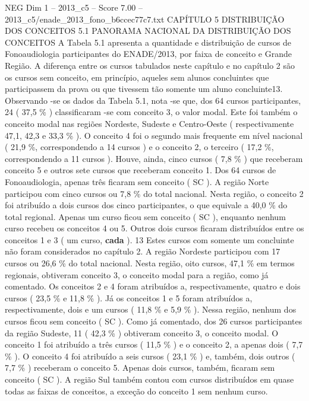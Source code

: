 \begin{textsample}{NEG Dim 1 – 2013\_c5 – Score 7.00 – 2013\_c5/enade\_2013\_fono\_b6ccec77c7.txt}  \label{ex:f1_neg_351}
CAPÍTULO 5 DISTRIBUIÇÃO DOS CONCEITOS 5.1 PANORAMA NACIONAL DA DISTRIBUIÇÃO DOS CONCEITOS A Tabela 5.1 apresenta a quantidade e distribuição de cursos de Fonoaudiologia participantes do ENADE/2013, por faixa de conceito e Grande Região.
A diferença entre os cursos tabulados neste capítulo e no capítulo 2 são os cursos sem conceito, em princípio, aqueles sem alunos concluintes que participassem da prova ou que tivessem tão somente um aluno concluinte13.
Observando -se os dados da Tabela 5.1, nota -se que, dos 64 cursos participantes, 24 ( 37,5 \% ) classificaram -se com conceito 3, o valor modal.
Este foi também o conceito modal nas regiões Nordeste, Sudeste e Centro-Oeste ( respectivamente 47,1, 42,3 e 33,3 \% ).
O conceito 4 foi o segundo mais frequente em nível nacional ( 21,9 \%, correspondendo a 14 cursos ) e o conceito 2, o terceiro ( 17,2 \%, correspondendo a 11 cursos ).
Houve, ainda, cinco cursos ( 7,8 \% ) que receberam conceito 5 e outros sete cursos que receberam conceito 1.
Dos 64 cursos de Fonoaudiologia, apenas três ficaram sem conceito ( SC ).
A região Norte participou com cinco cursos ou 7,8 \% do total nacional.
Nesta região, o conceito 2 foi atribuído a dois cursos dos cinco participantes, o que equivale a 40,0 \% do total regional.
Apenas um curso ficou sem conceito ( SC ), enquanto nenhum curso recebeu os conceitos 4 ou 5.
Outros dois cursos ficaram distribuídos entre os conceitos 1 e 3 ( um curso, \textbf{cada} ). 13 Estes cursos com somente um concluinte não foram considerados no capítulo 2.
A região Nordeste participou com 17 cursos ou 26,6 \% do total nacional.
Nesta região, oito cursos, 47,1 \% em termos regionais, obtiveram conceito 3, o conceito modal para a região, como já comentado.
Os conceitos 2 e 4 foram atribuídos a, respectivamente, quatro e dois cursos ( 23,5 \% e 11,8 \% ).
Já os conceitos 1 e 5 foram atribuídos a, respectivamente, dois e um cursos ( 11,8 \% e 5,9 \% ).
Nessa região, nenhum dos cursos ficou sem conceito ( SC ).
Como já comentado, dos 26 cursos participantes da região Sudeste, 11 ( 42,3 \% ) obtiveram conceito 3, o conceito modal.
O conceito 1 foi atribuído a três cursos ( 11,5 \% ) e o conceito 2, a apenas dois ( 7,7 \% ).
O conceito 4 foi atribuído a seis cursos ( 23,1 \% ) e, também, dois outros ( 7,7 \% ) receberam o conceito 5.
Apenas dois cursos, também, ficaram sem conceito ( SC ).
A região Sul também contou com cursos distribuídos em quase todas as faixas de conceitos, a exceção do conceito 1 sem nenhum curso.

\end{textsample}
